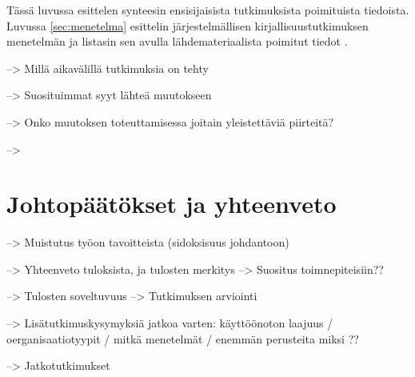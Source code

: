 Tässä luvussa esittelen synteesin ensisijaisista tutkimuksista poimituista
tiedoista. Luvussa \ref{sec:menetelma} esittelin järjestelmällisen
kirjallisuustutkimuksen menetelmän ja listasin sen avulla lähdemateriaalista
poimitut tiedot \citep{Kitchenham2007}.

--> Millä aikavälillä tutkimuksia on tehty

--> Suosituimmat syyt lähteä muutokseen

--> Onko muutoksen toteuttamisessa joitain yleistettäviä piirteitä?

--> 


\section{Johtopäätökset ja yhteenveto}
\label{sec:johtopaatokset}

--> Muistutus työon tavoitteista (sidoksisuus johdantoon)

--> Yhteenveto tuloksista, ja tulosten merkitys
--> Suositus toimnepiteisiin??

--> Tulosten soveltuvuus
--> Tutkimuksen arviointi

--> Lisätutkimuskysymyksiä jatkoa varten: käyttöönoton laajuus /
oerganisaatiotyypit / mitkä menetelmät / enemmän perusteita miksi ?? 

--> Jatkotutkimukset


